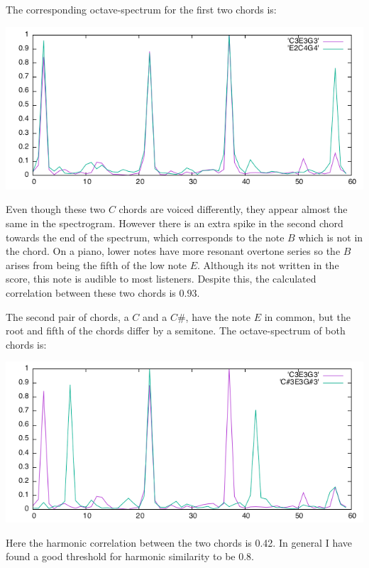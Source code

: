 \documentclass{amsart}
\theoremstyle{definition}
\begin{document}
The corresponding octave-spectrum for the first two chords is:

{\centering
\begin{center}
  \includegraphics[scale = 0.4]{sameChord}
\end{center}
}

Even though these two $C$ chords are voiced differently, they appear almost the same in the spectrogram.
However there is an extra spike in the second chord towards the end of the spectrum, which corresponds to the note $B$ which is not in the chord.
On a piano, lower notes have more resonant overtone series so the $B$ arises from being the fifth of the low note $E$.
Although its not written in the score, this note is audible to most listeners.
Despite this, the calculated correlation between these two chords is $0.93$.

The second pair of chords, a $C$ and a $C\#$, have the note $E$ in common, but the root and fifth of the chords differ by a semitone.
The octave-spectrum of both chords is:

{\centering
\begin{center}
  \includegraphics[scale = 0.4]{difChord}
\end{center}
}

Here the harmonic correlation between the two chords is 0.42.
In general I have found a good threshold for harmonic similarity to be 0.8.
\end{document}
